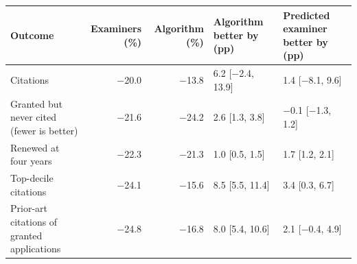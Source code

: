 \begin{tabular}{lrrll}
\toprule
Outcome & Examiners (\%) & Algorithm (\%) & Algorithm better by (pp) & Predicted examiner better by (pp) \\
\midrule
Citations & $-$20.0 & $-$13.8 & 6.2 [$-$2.4, 13.9] & 1.4 [$-$8.1, 9.6] \\
Granted but never cited (fewer is better) & $-$21.6 & $-$24.2 & 2.6 [1.3, 3.8] & $-$0.1 [$-$1.3, 1.2] \\
Renewed at four years & $-$22.3 & $-$21.3 & 1.0 [0.5, 1.5] & 1.7 [1.2, 2.1] \\
Top-decile citations & $-$24.1 & $-$15.6 & 8.5 [5.5, 11.4] & 3.4 [0.3, 6.7] \\
Prior-art citations of granted applications & $-$24.8 & $-$16.8 & 8.0 [5.4, 10.6] & 2.1 [$-$0.4, 4.9] \\
\bottomrule
\end{tabular}
